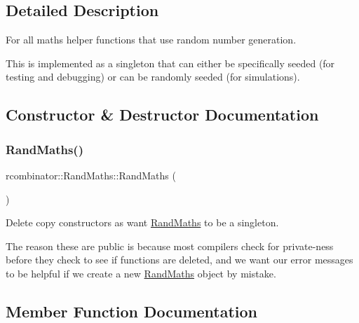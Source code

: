 \subsection{Detailed Description}
For all maths helper functions that use random number generation. 

This is implemented as a singleton that can either be specifically seeded (for testing and debugging) or can be randomly seeded (for simulations). 

\subsection{Constructor \& Destructor Documentation}
\mbox{\label{classrcombinator_1_1RandMaths_ac9b350a4aa07b739dcc2bb12c3b5c0e5}} 
\subsubsection{\texorpdfstring{Rand\+Maths()}{RandMaths()}}
{\footnotesize\ttfamily rcombinator\+::\+Rand\+Maths\+::\+Rand\+Maths (\begin{DoxyParamCaption}\item[{\mbox{\hyperlink{classrcombinator_1_1RandMaths}{Rand\+Maths}} const \&}]{ }\end{DoxyParamCaption})\hspace{0.3cm}{\ttfamily [delete]}}



Delete copy constructors as want \mbox{\hyperlink{classrcombinator_1_1RandMaths}{Rand\+Maths}} to be a singleton. 

The reason these are public is because most compilers check for private-\/ness before they check to see if functions are deleted, and we want our error messages to be helpful if we create a new \mbox{\hyperlink{classrcombinator_1_1RandMaths}{Rand\+Maths}} object by mistake. 

\subsection{Member Function Documentation}
\mbox{\label{classrcombinator_1_1RandMaths_afbc0d35bd9744ecab1983914ac32d68c}} 

